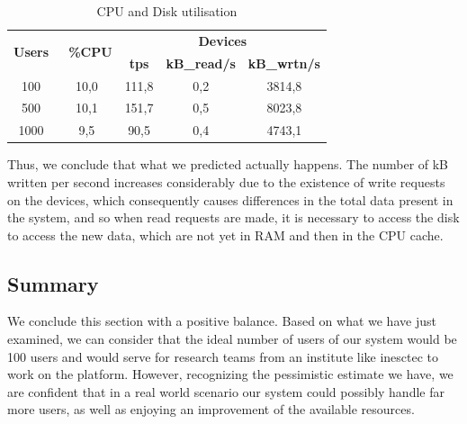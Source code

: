\begin{table}[h!]
\centering
\begin{tabular}{|c|c|c|c|c|} 
\hline
\multirow{2}{*}{\textbf{Users }} & \multirow{2}{*}{\textbf{~\%CPU}} & \multicolumn{3}{c|}{\textbf{Devices}}                     \\ 
\cline{3-5}
                                 &                                  & \textbf{tps} & \textbf{kB\_read/s} & \textbf{kB\_wrtn/s}  \\ 
\hline
100  & 10,0 & 111,8  & 0,2  &  3814,8                   \\ 
\hline
500  & 10,1 & 151,7 & 0,5 & 8023,8                    \\ 
\hline
1000 & 9,5 & 90,5 & 0,4 & 4743,1                 \\ 
\hline
\end{tabular}\caption{\label{tab:cpu_real}CPU and Disk utilisation}
\end{table}

Thus, we conclude that what we predicted actually happens. The number of kB written per second increases considerably due to the existence of write requests on the devices, which consequently causes differences in the total data present in the system, and so when read requests are made, it is necessary to access the disk to access the new data, which are not yet in RAM and then in the CPU cache.

  
  \subsection{Summary}
  
  We conclude this section with a positive balance. Based on what we have just examined, we can consider that the ideal number of users of our system would be 100 users and would serve for research teams from an institute like \gls{inesctec} to work on the platform. However, recognizing the pessimistic estimate we have, we are confident that in a real world scenario our system could possibly handle far more users, as well as enjoying an improvement of the available resources.
  